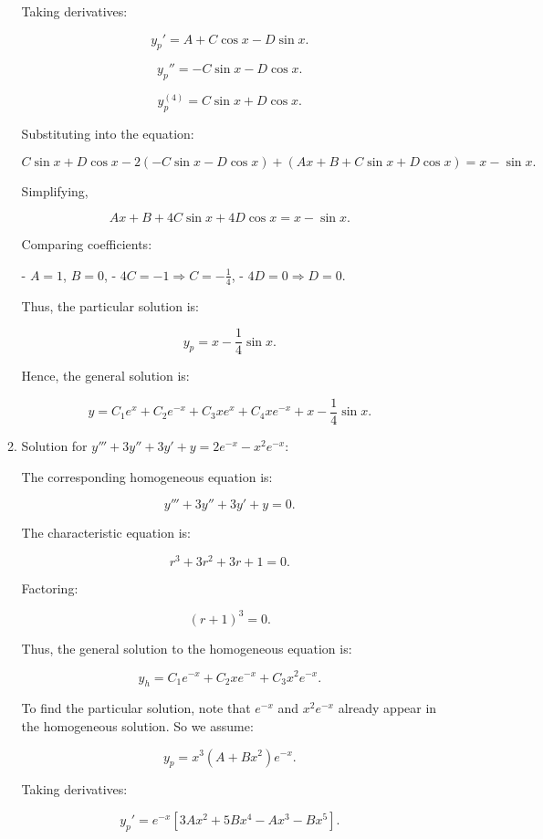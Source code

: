 \documentclass[12pt]{article}
\begin{document}
\begin{enumerate}
\begin{enumerate}
    Taking derivatives:

    \[
    y_p' = A + C\cos x - D\sin x.
    \]

    \[
    y_p'' = -C\sin x - D\cos x.
    \]

    \[
    y_p^{(4)} = C\sin x + D\cos x.
    \]

    Substituting into the equation:

    \[
    C\sin x + D\cos x - 2(-C\sin x - D\cos x) + (Ax + B + C\sin x + D\cos x) = x - \sin x.
    \]

    Simplifying,

    \[
    Ax + B + 4C\sin x + 4D\cos x = x - \sin x.
    \]

    Comparing coefficients:

    - \( A = 1 \), \( B = 0 \),
    - \( 4C = -1 \Rightarrow C = -\frac{1}{4} \),
    - \( 4D = 0 \Rightarrow D = 0 \).

    Thus, the particular solution is:

    \[
    y_p = x - \frac{1}{4} \sin x.
    \]

    Hence, the general solution is:

    \[
    y = C_1 e^x + C_2 e^{-x} + C_3 x e^x + C_4 x e^{-x} + x - \frac{1}{4} \sin x.
    \]

    \item Solution for  \( y''' + 3y'' + 3y' + y = 2e^{-x} - x^2 e^{-x} \):

    The corresponding homogeneous equation is:

    \[
    y''' + 3y'' + 3y' + y = 0.
    \]

    The characteristic equation is:

    \[
    r^3 + 3r^2 + 3r + 1 = 0.
    \]

    Factoring:

    \[
    (r+1)^3 = 0.
    \]

    Thus, the general solution to the homogeneous equation is:

    \[
    y_h = C_1 e^{-x} + C_2 x e^{-x} + C_3 x^2 e^{-x}.
    \]

    To find the particular solution, note that \( e^{-x} \) and \( x^2 e^{-x} \) already appear in the homogeneous solution. So we assume:

    \[
    y_p = x^3 (A + Bx^2) e^{-x}.
    \]

    Taking derivatives:

    \[
    y_p' = e^{-x} \left[ 3Ax^2 + 5Bx^4 - Ax^3 - Bx^5 \right].
    \]


\end{enumerate}
\end{enumerate}
\end{document}
